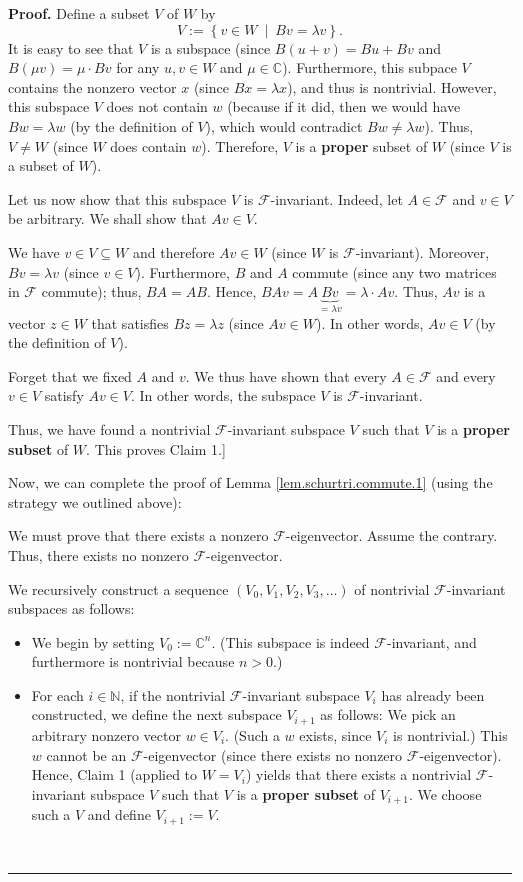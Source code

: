 \documentclass[numbers=enddot,12pt,final,onecolumn,notitlepage]{scrartcl}%
\numberwithin{exer}{subsection}
\theoremstyle{definition}
\newenvironment{proof}[1][Proof]{\noindent\textbf{#1.} }{\ \rule{0.5em}{0.5em}}
\begin{document}
\begin{proof}
Define a subset $V$ of $W$ by
\[
V:=\left\{  v\in W\ \mid\ Bv=\lambda v\right\}  .
\]
It is easy to see that $V$ is a subspace (since $B\left(  u+v\right)  =Bu+Bv$
and $B\left(  \mu v\right)  =\mu\cdot Bv$ for any $u,v\in W$ and $\mu
\in\mathbb{C}$). Furthermore, this subpace $V$ contains the nonzero vector $x$
(since $Bx=\lambda x$), and thus is nontrivial. However, this subspace $V$
does not contain $w$ (because if it did, then we would have $Bw=\lambda w$ (by
the definition of $V$), which would contradict $Bw\neq\lambda w$). Thus,
$V\neq W$ (since $W$ does contain $w$). Therefore, $V$ is a \textbf{proper}
subset of $W$ (since $V$ is a subset of $W$).

Let us now show that this subspace $V$ is $\mathcal{F}$-invariant. Indeed, let
$A\in\mathcal{F}$ and $v\in V$ be arbitrary. We shall show that $Av\in V$.

We have $v\in V\subseteq W$ and therefore $Av\in W$ (since $W$ is
$\mathcal{F}$-invariant). Moreover, $Bv=\lambda v$ (since $v\in V$).
Furthermore, $B$ and $A$ commute (since any two matrices in $\mathcal{F}$
commute); thus, $BA=AB$. Hence, $BAv=A\underbrace{Bv}_{=\lambda v}%
=\lambda\cdot Av$. Thus, $Av$ is a vector $z\in W$ that satisfies $Bz=\lambda
z$ (since $Av\in W$). In other words, $Av\in V$ (by the definition of $V$).

Forget that we fixed $A$ and $v$. We thus have shown that every $A\in
\mathcal{F}$ and every $v\in V$ satisfy $Av\in V$. In other words, the
subspace $V$ is $\mathcal{F}$-invariant.

Thus, we have found a nontrivial $\mathcal{F}$-invariant subspace $V$ such
that $V$ is a \textbf{proper subset} of $W$. This proves Claim 1.] \medskip

Now, we can complete the proof of Lemma \ref{lem.schurtri.commute.1} (using
the strategy we outlined above):

We must prove that there exists a nonzero $\mathcal{F}$-eigenvector. Assume
the contrary. Thus, there exists no nonzero $\mathcal{F}$-eigenvector.

We recursively construct a sequence $\left(  V_{0},V_{1},V_{2},V_{3}%
,\ldots\right)  $ of nontrivial $\mathcal{F}$-invariant subspaces as follows:

\begin{itemize}
\item We begin by setting $V_{0}:=\mathbb{C}^{n}$. (This subspace is indeed
$\mathcal{F}$-invariant, and furthermore is nontrivial because $n>0$.)

\item For each $i\in\mathbb{N}$, if the nontrivial $\mathcal{F}$-invariant
subspace $V_{i}$ has already been constructed, we define the next subspace
$V_{i+1}$ as follows: We pick an arbitrary nonzero vector $w\in V_{i}$. (Such
a $w$ exists, since $V_{i}$ is nontrivial.) This $w$ cannot be an
$\mathcal{F}$-eigenvector (since there exists no nonzero $\mathcal{F}%
$-eigenvector). Hence, Claim 1 (applied to $W=V_{i}$) yields that there exists
a nontrivial $\mathcal{F}$-invariant subspace $V$ such that $V$ is a
\textbf{proper subset} of $V_{i+1}$. We choose such a $V$ and define
$V_{i+1}:=V$.
\end{itemize}


\end{proof}
\end{document}
